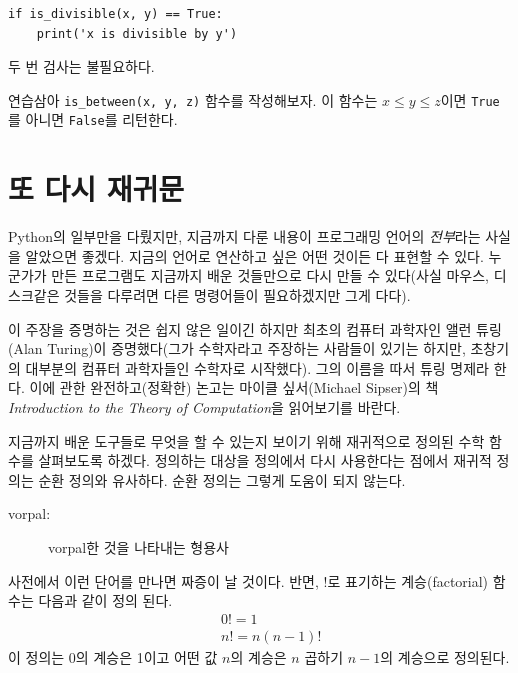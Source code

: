 \documentclass[10pt]{book}
\begin{document}
\begin{verbatim}
if is_divisible(x, y) == True:
    print('x is divisible by y')
\end{verbatim}
%
두 번 검사는 불필요하다.

연습삼아 \verb"is_between(x, y, z)" 함수를 작성해보자.  이 함수는 $x
\le y \le z$이면 {\tt True}를 아니면 {\tt False}를 리턴한다.


\section{또 다시 재귀문}
\label{more.recursion}

Python의 일부만을 다뤘지만, 지금까지 다룬 내용이 프로그래밍 언어의
{\em 전부}라는 사실을 알았으면 좋겠다.  지금의 언어로 연산하고 싶은
어떤 것이든 다 표현할 수 있다.  누군가가 만든 프로그램도 지금까지 배운
것들만으로 다시 만들 수 있다(사실 마우스, 디스크같은 것들을 다루려면
다른 명령어들이 필요하겠지만 그게 다다).

이 주장을 증명하는 것은 쉽지 않은 일이긴 하지만 최초의 컴퓨터 과학자인
앨런 튜링(Alan Turing)이 증명했다(그가 수학자라고 주장하는 사람들이
있기는 하지만, 초창기의 대부분의 컴퓨터 과학자들인 수학자로 시작했다).
그의 이름을 따서 튜링 명제라 한다.  이에 관한 완전하고(정확한) 논고는
마이클 싶서(Michael Sipser)의 책 {\em Introduction to the Theory of
  Computation}을 읽어보기를 바란다.

지금까지 배운 도구들로 무엇을 할 수 있는지 보이기 위해 재귀적으로
정의된 수학 함수를 살펴보도록 하겠다.  정의하는 대상을 정의에서 다시
사용한다는 점에서 재귀적 정의는 순환 정의와 유사하다.  순환 정의는
그렇게 도움이 되지 않는다.


\begin{description}

\item[vorpal:] vorpal한 것을 나타내는 형용사

\end{description}

사전에서 이런 단어를 만나면 짜증이 날 것이다.  반면, $!$로 표기하는
계승(factorial) 함수는 다음과 같이 정의 된다.
%
\begin{eqnarray*}
&&  0! = 1 \\
&&  n! = n (n-1)!
\end{eqnarray*}
%
이 정의는 0의 계승은 1이고 어떤 값 $n$의 계승은 $n$ 곱하기 $n-1$의
계승으로 정의된다.
\end{document}
